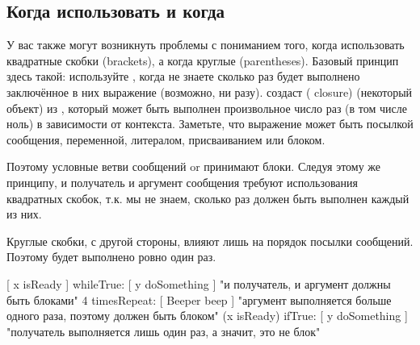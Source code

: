 \documentclass[a4paper,10pt,twoside]{book}
\begin{document}
\subsection{Когда использовать \lct{[ ]} и когда \lct{( )}}
У вас также могут возникнуть проблемы с пониманием того, когда использовать квадратные скобки (brackets), а когда круглые (parentheses).
Базовый принцип здесь такой: используйте \ct{[ ]}, когда не знаете сколько раз будет выполнено заключённое в них выражение (возможно, ни разу).
 создаст  ( closure) (\ie некоторый объект) из , который может быть выполнен произвольное число раз (в том числе ноль) в зависимости от контекста. Заметьте, что выражение может быть посылкой сообщения, переменной, литералом, присваиванием или блоком.

Поэтому условные ветви сообщений  or  принимают блоки. Следуя этому же принципу, и получатель и аргумент сообщения  требуют использования квадратных скобок, т.к. мы не знаем, сколько раз должен быть выполнен каждый из них.

Круглые скобки, с другой стороны, влияют лишь на порядок посылки сообщений.
Поэтому  будет выполнено ровно один раз.

\begin{code}{}
[ x isReady ] whileTrue: [ y doSomething ]   "и получатель, и аргумент должны быть блоками"
4 timesRepeat: [ Beeper beep ]                   "аргумент выполняется больше одного раза, поэтому должен быть блоком"
(x isReady) ifTrue: [ y doSomething ]           "получатель выполняется лишь один раз, а значит, это не блок"
\end{code}
\end{document}
